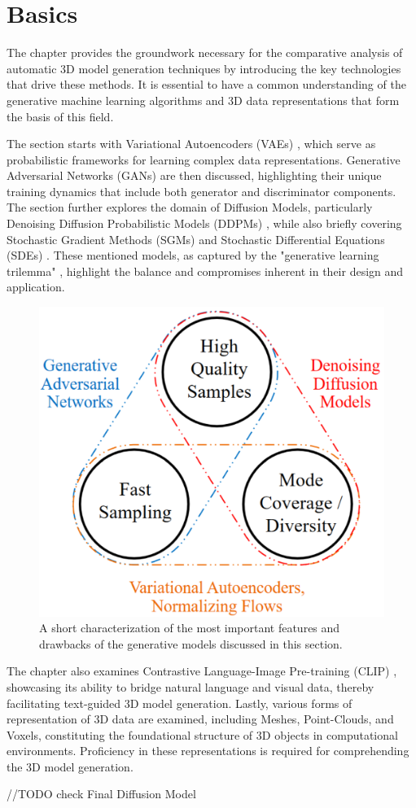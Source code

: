 \chapter{Basics}
\label{ch:basics}

The chapter provides the groundwork necessary for the comparative analysis of automatic 3D model generation techniques by introducing the key technologies that drive these methods. It is essential to have a common understanding of the generative machine learning algorithms and 3D data representations that form the basis of this field.

The section starts with Variational Autoencoders (VAEs) \citep{kingmaVAE,rezendeVAE}, which serve as probabilistic frameworks for learning complex data representations. Generative Adversarial Networks (GANs) \citep{goodfellowGAN} are then discussed, highlighting their unique training dynamics that include both generator and discriminator components. The section further explores the domain of Diffusion Models, particularly Denoising Diffusion Probabilistic Models (DDPMs) \citep{hoDDPMs,sohlDDPM}, while also briefly covering Stochastic Gradient Methods (SGMs) \citep{song2019SGM} and Stochastic Differential Equations (SDEs) \citep{song2020score,song2021maximum}. These mentioned models, as captured by the "generative learning trilemma" \citep{xiao2022tackling}, highlight the balance and compromises inherent in their design and application.

\begin{figure}[ht]
    \centering
      \includegraphics[width=.4\columnwidth]{figures/BasicTrilemma.png}
      \caption{A short characterization of the most important features and drawbacks of the generative models discussed in this section.~\citep{xiao2022tackling}}
      \label{fig:generativeTrilemma}
\end{figure}

The chapter also examines Contrastive Language-Image Pre-training (CLIP) \citep{radfordCLIP}, showcasing its ability to bridge natural language and visual data, thereby facilitating text-guided 3D model generation. Lastly, various forms of representation of 3D data are examined, including Meshes, Point-Clouds, and Voxels, constituting the foundational structure of 3D objects in computational environments. Proficiency in these representations is required for comprehending the 3D model generation.

//TODO check Final Diffusion Model






